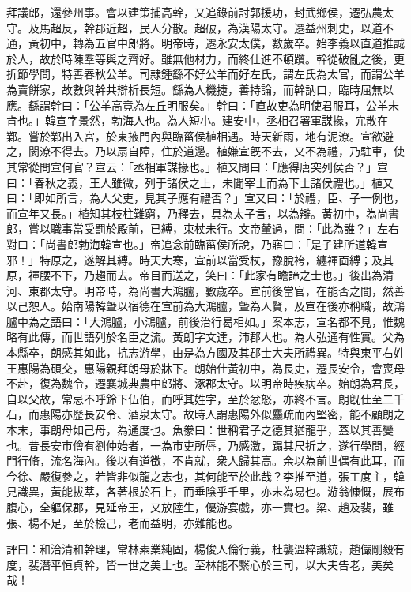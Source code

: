 \begin{pinyinscope}
拜議郎，還參州事。會以建策捕高幹，又追錄前討郭援功，封武鄉侯，遷弘農太守。及馬超反，幹郡近超，民人分散。超破，為漢陽太守。遷益州刺史，以道不通，黃初中，轉為五官中郎將。明帝時，遷永安太僕，數歲卒。始李義以直道推誠於人，故於時陳羣等與之齊好。雖無他材力，而終仕進不頓躓。幹從破亂之後，更折節學問，特善春秋公羊。司隷鍾繇不好公羊而好左氏，謂左氏為太官，而謂公羊為賣餅家，故數與幹共辯析長短。繇為人機捷，善持論，而幹訥口，臨時屈無以應。繇謂幹曰：「公羊高竟為左丘明服矣。」幹曰：「直故吏為明使君服耳，公羊未肯也。」韓宣字景然，勃海人也。為人短小。建安中，丞相召署軍謀掾，宂散在鄴。嘗於鄴出入宮，於東掖門內與臨菑侯植相遇。時天新雨，地有泥潦。宣欲避之，閡潦不得去。乃以扇自障，住於道邊。植嫌宣旣不去，又不為禮，乃駐車，使其常從問宣何官？宣云：「丞相軍謀掾也。」植又問曰：「應得唐突列侯否？」宣曰：「春秋之義，王人雖微，列于諸侯之上，未聞宰士而為下士諸侯禮也。」植又曰：「即如所言，為人父吏，見其子應有禮否？」宣又曰：「於禮，臣、子一例也，而宣年又長。」植知其枝柱難窮，乃釋去，具為太子言，以為辯。黃初中，為尚書郎，嘗以職事當受罰於殿前，已縛，束杖未行。文帝輦過，問：「此為誰？」左右對曰：「尚書郎勃海韓宣也。」帝追念前臨菑侯所說，乃寤曰：「是子建所道韓宣邪！」特原之，遂解其縛。時天大寒，宣前以當受杖，豫脫袴，纏褌靣縛；及其原，褌腰不下，乃趨而去。帝目而送之，笑曰：「此家有瞻諦之士也。」後出為清河、東郡太守。明帝時，為尚書大鴻臚，數歲卒。宣前後當官，在能否之間，然善以己恕人。始南陽韓曁以宿德在宣前為大鴻臚，曁為人賢，及宣在後亦稱職，故鴻臚中為之語曰：「大鴻臚，小鴻臚，前後治行曷相如。」案本志，宣名都不見，惟魏略有此傳，而世語列於名臣之流。黃朗字文達，沛郡人也。為人弘通有性實。父為本縣卒，朗感其如此，抗志游學，由是為方國及其郡士大夫所禮異。特與東平右姓王惠陽為碩交，惠陽親拜朗母於牀下。朗始仕黃初中，為長吏，遷長安令，會喪母不赴，復為魏令，遷襄城典農中郎將、涿郡太守。以明帝時疾病卒。始朗為君長，自以父故，常忌不呼鈴下伍伯，而呼其姓字，至於忿怒，亦終不言。朗旣仕至二千石，而惠陽亦歷長安令、酒泉太守。故時人謂惠陽外似麤疏而內堅密，能不顧朗之本末，事朗母如己母，為通度也。魚豢曰：世稱君子之德其猶龍乎，蓋以其善變也。昔長安巿儈有劉仲始者，一為巿吏所辱，乃感激，蹋其尺折之，遂行學問，經門行脩，流名海內。後以有道徵，不肯就，衆人歸其高。余以為前世偶有此耳，而今徐、嚴復參之，若皆非似龍之志也，其何能至於此哉？李推至道，張工度主，韓見識異，黃能拔萃，各著根於石上，而垂陰乎千里，亦未為易也。游翁慷慨，展布腹心，全軀保郡，見延帝王，又放陸生，優游宴戲，亦一實也。梁、趙及裴，雖張、楊不足，至於檢己，老而益明，亦難能也。

評曰：和洽清和幹理，常林素業純固，楊俊人倫行義，杜襲溫粹識統，趙儼剛毅有度，裴潛平恒貞幹，皆一世之美士也。至林能不繫心於三司，以大夫告老，美矣哉！


\end{pinyinscope}